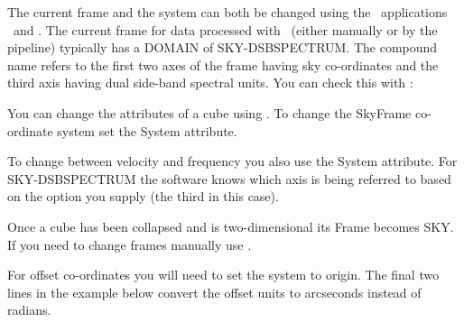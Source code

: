 \documentclass[11pt,oneside,chapters]{starlink}
\providecommand{\att}[1]{\textsf{#1}}
\begin{document}
The current frame and the system can both be changed using the \Kappa\
applications \wcsframe\ and \wcsattrib. The current frame for data
processed with \makecube\ (either manually or by the pipeline)
typically has a DOMAIN of SKY-DSBSPECTRUM. The compound name refers to
the first two axes of the frame having sky co-ordinates and the third
axis having dual side-band spectral units. You can check this with
\ndftrace:

\begin{terminalv}
\end{terminalv}
You can change the attributes of a cube using \wcsattrib. To change
the SkyFrame co-ordinate system set the \att{System} attribute.
\begin{terminalv}
\end{terminalv}
To change between velocity and frequency you also use the
\att{System} attribute. For SKY-DSBSPECTRUM the software knows which
axis is being referred to based on the option you supply (the third in
this case).
\begin{terminalv}
\end{terminalv}
Once a cube has been collapsed and is two-dimensional its Frame
becomes SKY. If you need to change frames manually use \wcsframe.
\begin{terminalv}
\end{terminalv}

For offset co-ordinates you will need to set the system
 to origin. The final two lines in the example below
convert the offset units to arcseconds instead of radians.
\begin{terminalv}
\end{terminalv}

%

%
\end{document}
